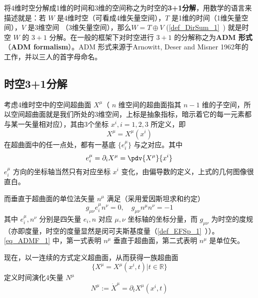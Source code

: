 
\begin{issues}
\end{issues}


将4维时空分解成1维的时间和3维的空间称之为时空的\textbf{3+1分解}，用数学的语言来描述就是：若 $W$ 是4维时空（可看成4维矢量空间），$T$ 是1维的时间（1维矢量空间），$V$ 是3维空间 （3维矢量空间），那么$W=T\oplus V$ (\autoref{def_DirSum_1}~) 就是时空 $W$ 的 $3+1$ 分解。在一般的框架下对时空进行 $3+1$ 的分解称之为\textbf{ADM 形式}（\textbf{ADM formalism}）。ADM 形式来源于Arnowitt, Deser and Misner 1962年的工作，并以三人的首字母命名。
\subsection{时空3+1分解}
考虑4维时空中的空间超曲面 $X^\mu$（ $n$ 维空间的超曲面指其 $n-1$ 维的子空间，所以空间超曲面就是我们所处的3维空间，上标是抽象指标，暗示着它的每一元素都与某一矢量相对应），其由3个坐标 $x^i,i=1,2,3$ 所定义，即 
\begin{equation}
X^\mu=X^\mu(x^i)
\end{equation}
在超曲面中的任一点处，都有一基底 $\{e^\mu_i\}$ 与之对应。其中
\begin{equation}
e^\mu_i=\partial_i  X^\mu=\pdv{ X^\mu}{x^i}
\end{equation}
$e^\mu_i$ 方向的坐标轴当然只有对应坐标 $x^i$ 变化，由偏导数的定义，上式的几何图像很直白。

而垂直于超曲面的单位法矢量 $n^\mu$ 满足（采用爱因斯坦求和约定）
\begin{equation}\label{eq_ADMF_1}
g_{\mu\nu} e_i^\mu n^\nu=0,\quad g_{\mu\nu}n^\mu n^\nu=-1
\end{equation}
其中 $e_i^\mu,n^\nu$ 分别是四矢量 $ e_i,n$ 对应 $\mu,\nu$ 坐标轴的坐标分量，而 $g_{\mu\nu}$ 为时空的度规（亦即度量，时空的度量显然是闵可夫斯基度量（\autoref{def_EFSp_1}~））。\autoref{eq_ADMF_1} 中，第一式表明 $n^\mu$ 垂直于超曲面，第二式表明 $n^\mu$ 是单位矢。

现在，以一连续的方式定义超曲面，从而获得一族超曲面 
\begin{equation}
\{{X^\mu}= X^\mu(x^i,t)|t\in\mathbb R\}
\end{equation}
定义时间演化4矢量 $N^\mu$
\begin{equation}
N^\mu:=\dot{X}^\mu=\partial_t  X^\mu(x^i,t)
\end{equation}

